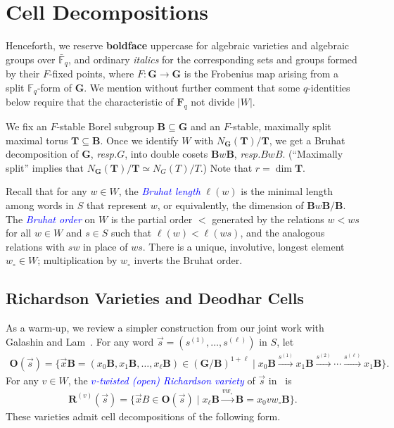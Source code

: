 \documentclass[submission]{FPSAC2025}
\newcommand{\dfemph}[1]{\textcolor{blue}{\emph{#1}}}
\newcommand{\m}{p}
\begin{document}

\section{Cell Decompositions}\label{sec:varieties}

Henceforth, we reserve \textbf{boldface} uppercase for algebraic varieties and algebraic groups over $\bar{\mathbb{F}}_q$, and ordinary \emph{italics} for the corresponding sets and groups formed by their $F$-fixed points, where $F : \mathbf{G} \to \mathbf{G}$ is the Frobenius map arising from a split $\mathbb{F}_q$-form of $\mathbf{G}$.
We mention without further comment that some $q$-identities below require that the characteristic of $\mathbf{F}_q$ not divide $|W|$.

We fix an $F$-stable Borel subgroup $\mathbf{B} \subseteq \mathbf{G}$ and an $F$-stable, maximally split maximal torus $\mathbf{T} \subseteq \mathbf{B}$.
Once we identify $W$ with $N_\mathbf{G}(\mathbf{T})/\mathbf{T}$, we get a Bruhat decomposition of $\mathbf{G}$, \emph{resp.}\@ $G$, into double cosets $\mathbf{B}w\mathbf{B}$, \emph{resp.}\@ $BwB$.
(``Maximally split'' implies that $N_\mathbf{G}(\mathbf{T})/\mathbf{T} \simeq N_G(T)/T$.)
Note that $r = \dim \mathbf{T}$.

Recall that for any $w \in W$, the \dfemph{Bruhat length} $\ell(w)$ is the minimal length among words in $S$ that represent $w$, or equivalently, the dimension of $\mathbf{B}w\mathbf{B}/\mathbf{B}$.
The \dfemph{Bruhat order} on $W$ is the partial order $<$ generated by the relations $w < ws$ for all $w \in W$ and $s \in S$ such that $\ell(w) < \ell(ws)$, and the analogous relations with $sw$ in place of $ws$.
There is a unique, involutive, longest element $w_\circ \in W$; multiplication by $w_\circ$ inverts the Bruhat order.

\subsection{Richardson Varieties and Deodhar Cells}

As a warm-up, we review a simpler construction from our joint work with Galashin and Lam~\cite{gltw}.
For any word $\vec{s} = (s^{(1)}, \ldots, s^{(\ell)})$ in $S$, let
\begin{align}
\mathbf{O}(\vec{s}) = \{\vec{x}\mathbf{B} = (x_0\mathbf{B}, x_1\mathbf{B}, \ldots, x_\ell\mathbf{B}) \in (\mathbf{G}/\mathbf{B})^{1 + \ell} \mid x_0\mathbf{B} \xrightarrow{s^{(1)}} x_1\mathbf{B} \xrightarrow{s^{(2)}} \cdots \xrightarrow{s^{(\ell)}} x_1\mathbf{B}\}.
\end{align}
For any $v \in W$, the \dfemph{$v$-twisted (open) Richardson variety} of $\vec{s}$ in~\cite{gltw} is
\begin{align}
\mathbf{R}^{(v)}(\vec{s})
	= \{
		\vec{x}B \in \mathbf{O}(\vec{s}) \mid
		x_\ell \mathbf{B} \xrightarrow{vw_\circ} \mathbf{B} = x_0vw_\circ\mathbf{B}
		\}.
\end{align}
These varieties admit cell decompositions of the following form.
\end{document}
